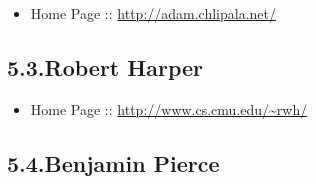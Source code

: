 \documentclass[12pt,twoside]{article}
\begin{document}
\begin{itemize}[noitemsep,topsep=\mdcompacttopsep]%

\item{}Home Page :: \href{http://adam.chlipala.net/}{{\ttfamily http://\hspace{0pt}adam.\hspace{0pt}chlipala.\hspace{0pt}net/\hspace{0pt}}}%
\end{itemize}%

\subsection{5.3.\hspace*{0.5em}Robert Harper}\label{sec-robert-harper}%

\begin{itemize}[noitemsep,topsep=\mdcompacttopsep]%

\item{}Home Page :: \href{http://www.cs.cmu.edu/~rwh/}{{\ttfamily http://\hspace{0pt}www.\hspace{0pt}cs.\hspace{0pt}cmu.\hspace{0pt}edu/\hspace{0pt}\textasciitilde{}rwh/\hspace{0pt}}}%
\end{itemize}%

\subsection{5.4.\hspace*{0.5em}Benjamin Pierce}\label{sec-benjamin-pierce}%
\end{document}
